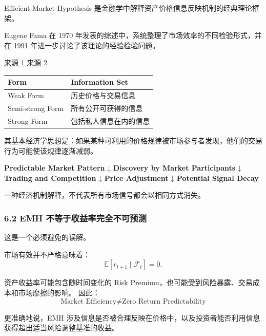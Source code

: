 Efficient Market Hypothesis 是金融学中解释资产价格信息反映机制的经典理论框架。

Eugene Fama 在 1970 年发表的综述中，系统整理了市场效率的不同检验形式，并在 1991 年进一步讨论了该理论的经验检验问题。

\href{https://doi.org/10.1111/j.1540-6261.1970.tb00518.x}{来源 1} \href{https://onlinelibrary.wiley.com/doi/full/10.1111/j.1540-6261.1991.tb04636.x}{来源 2}

\begin{readertable}
\begin{longtable}[]{@{}
  >{\raggedright\arraybackslash}p{}
  >{\raggedright\arraybackslash}p{}@{}}
\toprule
Form & Information Set \\
\midrule
\endhead
Weak Form & 历史价格与交易信息 \\
Semi-strong Form & 所有公开可获得的信息 \\
Strong Form & 包括私人信息在内的信息 \\
\bottomrule
\end{longtable}
\end{readertable}

其基本经济学思想是：如果某种可利用的价格规律被市场参与者发现，他们的交易行为可能使该规律逐渐减弱。

\textbf{Predictable Market Pattern} ↓ \textbf{Discovery by Market Participants} ↓ \textbf{Trading and Competition} ↓ \textbf{Price Adjustment} ↓ \textbf{Potential Signal Decay}

一种经济机制解释，不代表所有市场信号都会以相同方式消失。

\hypertarget{part-4-60-0001-emh-ux4e0dux7b49ux4e8eux6536ux76caux7387ux5b8cux5168ux4e0dux53efux9884ux6d4b}{%
\subsubsection{6.2 EMH 不等于收益率完全不可预测}\label{part-4-60-0001-emh-ux4e0dux7b49ux4e8eux6536ux76caux7387ux5b8cux5168ux4e0dux53efux9884ux6d4b}}

这是一个必须避免的误解。

市场有效并不严格意味着：
\[\mathbb E[r_{t+1}\mid\mathcal F_t]=0.\]

资产收益率可能包含随时间变化的 Risk Premium，也可能受到风险暴露、交易成本和市场摩擦的影响。 因此：
\[\boxed{
\text{Market Efficiency}
\neq
\text{Zero Return Predictability}
}\]

更准确地说，EMH 涉及信息是否被合理反映在价格中，以及投资者能否利用信息获得超出适当风险调整基准的收益。

